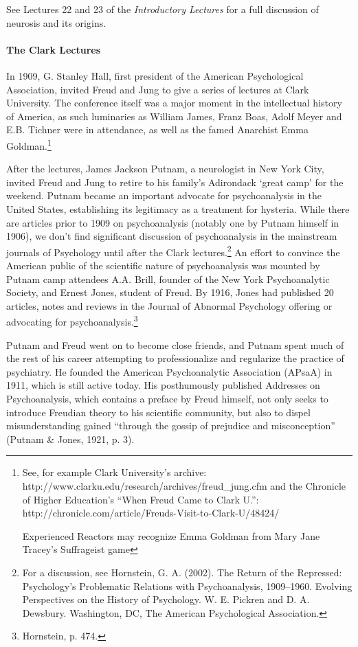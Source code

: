 See Lectures 22 and 23 of the \emph{Introductory Lectures} for a full discussion of neurosis and its origins.

\paragraph{The Clark Lectures}
\label{theclarklectures}

In 1909, G. Stanley Hall, first president of the American Psychological Association, invited Freud and Jung to give a series of lectures at Clark University. The conference itself was a major moment in the intellectual history of America, as such luminaries as William James, Franz Boas, Adolf Meyer and E.B. Tichner were in attendance, as well as the famed Anarchist Emma Goldman.\footnote{See, for example Clark University's archive: http:\slash \slash www.clarku.edu\slash research\slash archives\slash freud\_jung.cfm and the Chronicle of Higher Education's ``When Freud Came to Clark U.'': http:\slash \slash chronicle.com\slash article\slash Freuds-Visit-to-Clark-U\slash 48424\slash 

Experienced Reactors may recognize Emma Goldman from Mary Jane Tracey's Suffrageist game}

After the lectures, James Jackson Putnam, a neurologist in New York City, invited Freud and Jung to retire to his family's Adirondack `great camp' for the weekend. Putnam became an important advocate for psychoanalysis in the United States, establishing its legitimacy as a treatment for hysteria. While there are articles prior to 1909 on psychoanalysis (notably one by Putnam himself in 1906), we don't find significant discussion of psychoanalysis in the mainstream journals of Psychology until after the Clark lectures.\footnote{For a discussion, see Hornstein, G. A. (2002). The Return of the Repressed: Psychology's Problematic Relations with Psychoanalysis, 1909--1960. Evolving Perspectives on the History of Psychology. W. E. Pickren and D. A. Dewsbury. Washington, DC, The American Psychological Association.} An effort to convince the American public of the scientific nature of psychoanalysis was mounted by Putnam camp attendees A.A. Brill, founder of the New York Psychoanalytic Society, and Ernest Jones, student of Freud. By 1916, Jones had published 20 articles, notes and reviews in the Journal of Abnormal Psychology offering or advocating for psychoanalysis.\footnote{Hornstein, p. 474.}

Putnam and Freud went on to become close friends, and Putnam spent much of the rest of his career attempting to professionalize and regularize the practice of psychiatry. He founded the American Psychoanalytic Association (APsaA) in 1911, which is still active today. His posthumously published Addresses on Psychoanalysis, which contains a preface by Freud himself, not only seeks to introduce Freudian theory to his scientific community, but also to dispel misunderstanding gained ``through the gossip of prejudice and misconception'' (Putnam \& Jones, 1921, p. 3).

